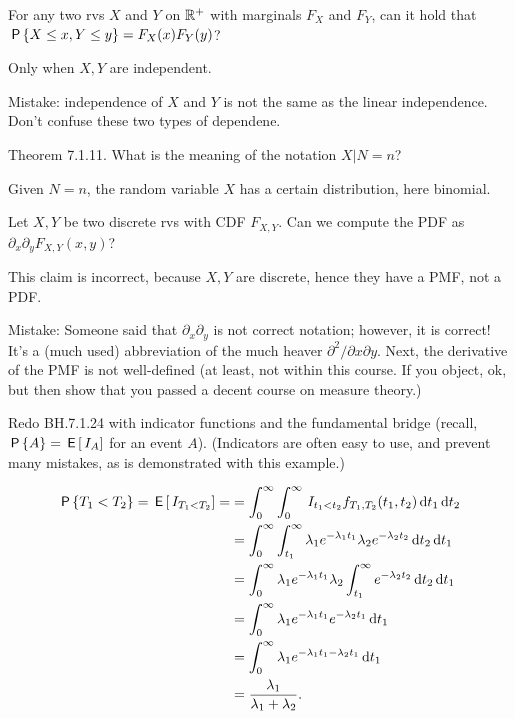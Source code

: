 \begin{exercise}
For any two rvs $X$ and $Y$ on $\R^{+}$ with marginals $F_{X}$ and $F_{Y}$, can  it hold that $\P{X\leq x, Y\leq y} = F_{X}(x) F_{Y}(y)$?
\begin{solution}
Only when $X, Y$ are independent.

Mistake:  independence of $X$ and $Y$ is not the same as the linear independence. Don't confuse these two types of dependene.
\end{solution}

\end{exercise}

\begin{exercise}
Theorem 7.1.11. What is the meaning of the notation $X|N=n$?
\begin{solution}
  Given $N=n$, the random variable $X$ has a certain distribution, here binomial.
\end{solution}
\end{exercise}

\begin{exercise}
Let $X, Y$ be two discrete rvs with CDF $F_{X,Y}$.  Can we compute the PDF as $\partial_{x}\partial_{y} F_{X,Y}(x,y)$?
\begin{solution}
This claim is incorrect, because $X, Y$ are discrete, hence they have a PMF, not a PDF.

Mistake: Someone said that $\partial_{x}\partial_{y}$ is not correct notation; however, it is correct! It's a (much used) abbreviation of the much heaver $\partial^{2}/\partial x \partial y$. Next, the derivative of the PMF is not well-defined (at least, not within this course. If you object, ok, but then show that you passed a decent course on measure theory.)
\end{solution}
\end{exercise}

\begin{exercise} Redo BH.7.1.24 with indicator functions and the  fundamental bridge (recall, $\P{A} = \E{\1{A}}$ for an event $A$).
(Indicators are often  easy to use, and prevent many mistakes, as is demonstrated with this example.)
\begin{solution}
\begin{align*}
\P{T_1 < T_2 } = \E{\1{T_1<T_2}} =
&= \int_0^\infty \int_0^\infty \1{t_1<t_2} f_{T_1, T_2}(t_1, t_2)\d t_{1} \d{t_2} \\
&= \int_0^\infty \int_{t_1}^{\infty}  \lambda_1 e^{-\lambda_1 t_1} \lambda_2 e^{-\lambda_2 t_2}  \d{t_2} \d{t_1}\\
&= \int_0^\infty   \lambda_1 e^{-\lambda_1 t_1} \lambda_2 \int_{t_1}^{\infty} e^{-\lambda_2 t_2}  \d{t_2} \d{t_1}\\
&= \int_0^\infty   \lambda_1 e^{-\lambda_1 t_1} e^{-\lambda_2 t_1}  \d{t_1}\\
&= \int_0^\infty   \lambda_1 e^{-\lambda_1 t_1 - \lambda_2t_{1}} \d{t_1}\\
&= \frac{\lambda_{1}}{\lambda_{1}+\lambda_2}.
\end{align*}
\end{solution}
\end{exercise}



